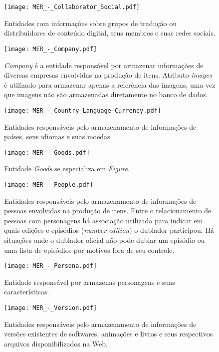 \documentclass[12pt]{article}
\begin{document}
\begin{figure}[H]
\centering
\texttt{[image: MER\_-\_Collaborator\_Social.pdf]}
\caption{Entidades com informações sobre grupos de tradução ou distribuidores de conteúdo digital, seus membros e suas redes sociais.} \label{collaborator}
\end{figure}


\begin{figure}[H]
\centering
\texttt{[image: MER\_-\_Company.pdf]}
\caption{\textit{Company} é a entidade responsável por armazenar informações de diversas empresas envolvidas na produção de itens. Atributo \textit{images} é utilizado para armazenar apenas a referência das imagens, uma vez que imagens não são armazenadas diretamente no banco de dados.}\label{company}
\end{figure}

\begin{figure}[H]
\centering
\texttt{[image: MER\_-\_Country-Language-Currency.pdf]}
\caption{Entidades responsáveis pelo armazenamento de informações de países, seus idiomas e suas moedas.} \label{hash}
\end{figure}

\begin{figure}[H]
\centering
\texttt{[image: MER\_-\_Goods.pdf]}
\caption{Entidade \textit{Goods} se especializa em \textit{Figure}.} \label{goods}
\end{figure}

\begin{figure}[H]
\centering
\texttt{[image: MER\_-\_People.pdf]}
\caption{Entidades responsáveis pelo armazenamento de informações de pessoas envolvidas na produção de itens. Entre o relacionamento de pessoas com personagens há associação utilizada para indicar em quais edições e episódios (\textit{number edition}) o dublador participou. Há situações onde o dublador oficial não pode dublar um episódio ou uma lista de episódios por motivos fora de seu controle.} \label{hash}
\end{figure}

\begin{figure}[H]
\centering
\texttt{[image: MER\_-\_Persona.pdf]}
\caption{Entidade responsável por armazenas personagens e suas características.} \label{Persona}
\end{figure}


\begin{figure}[H]
\centering
\texttt{[image: MER\_-\_Version.pdf]}
\caption{Entidades responsáveis pelo armazenamento de informações de versões existentes de softwares, animações e livros e seus respectivos arquivos disponibilizados na Web.} \label{hash}
\end{figure}
\end{document}
